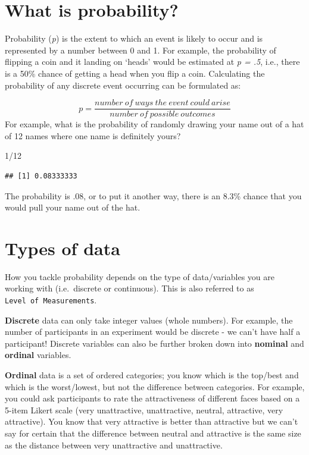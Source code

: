 \documentclass[
  oneside]{book}
\newenvironment{Shaded}{\begin{snugshade}}{\end{snugshade}}
\newcommand{\DecValTok}[1]{\textcolor[rgb]{0.00,0.00,0.81}{#1}}
\newcommand{\SpecialCharTok}[1]{\textcolor[rgb]{0.00,0.00,0.00}{#1}}
\begin{document}
\hypertarget{what-is-probability}{%
\section{What is probability?}\label{what-is-probability}}

Probability (\emph{p}) is the extent to which an event is likely to occur and is represented by a number between 0 and 1. For example, the probability of flipping a coin and it landing on `heads' would be estimated at \emph{p = .5}, i.e., there is a 50\% chance of getting a head when you flip a coin. Calculating the probability of any discrete event occurring can be formulated as:

\[p = \frac{number \  of  \ ways \ the \ event \ could \  arise}{number \ of \ possible \ outcomes}\]
For example, what is the probability of randomly drawing your name out of a hat of 12 names where one name is definitely yours?

\begin{Shaded}
\begin{Highlighting}[]
\DecValTok{1}\SpecialCharTok{/}\DecValTok{12}
\end{Highlighting}
\end{Shaded}

\begin{verbatim}
## [1] 0.08333333
\end{verbatim}

The probability is .08, or to put it another way, there is an 8.3\% chance that you would pull your name out of the hat.

\hypertarget{types-of-data}{%
\section{Types of data}\label{types-of-data}}

How you tackle probability depends on the type of data/variables you are working with (i.e.~discrete or continuous). This is also referred to as \texttt{Level\ of\ Measurements}.

\textbf{Discrete} data can only take integer values (whole numbers). For example, the number of participants in an experiment would be discrete - we can't have half a participant! Discrete variables can also be further broken down into \textbf{nominal} and \textbf{ordinal} variables.

\textbf{Ordinal} data is a set of ordered categories; you know which is the top/best and which is the worst/lowest, but not the difference between categories. For example, you could ask participants to rate the attractiveness of different faces based on a 5-item Likert scale (very unattractive, unattractive, neutral, attractive, very attractive). You know that very attractive is better than attractive but we can't say for certain that the difference between neutral and attractive is the same size as the distance between very unattractive and unattractive.
\end{document}
